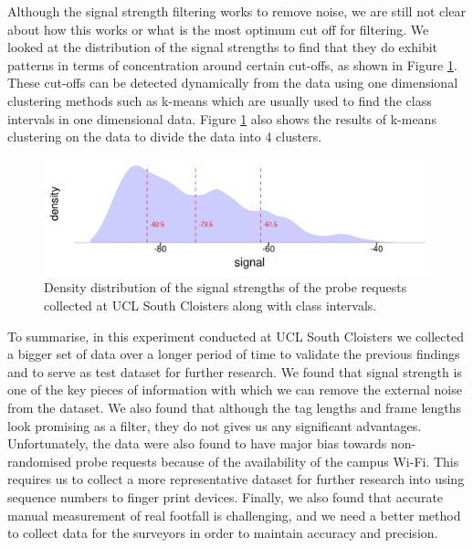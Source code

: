 Although the signal strength filtering works to remove noise, we are still not clear about how this works or what is the most optimum cut off for filtering.
We looked at the distribution of the signal strengths to find that they do exhibit patterns in terms of concentration around certain cut-offs, as shown in Figure \ref{figure:collection:ucl:signal}.
These cut-offs can be detected dynamically from the data using one dimensional clustering methods such as k-means which are usually used to find the class intervals in one dimensional data.
Figure \ref{figure:collection:ucl:signal} also shows the results of k-means clustering on the data to divide the data into 4 clusters.

\begin{figure}
\includegraphics[trim={5 5 5 5},clip]{images/ucl-signal-dist.png}
  \caption{Density distribution of the signal strengths of the probe requests collected at UCL South Cloisters along with class intervals.}
  \label{figure:collection:ucl:signal}
\end{figure}

To summarise, in this experiment conducted at UCL South Cloisters we collected a bigger set of data over a longer period of time to validate the previous findings and to serve as test dataset for further research.
We found that signal strength is one of the key pieces of information with which we can remove the external noise from the dataset.
We also found that although the tag lengths and frame lengths look promising as a filter, they do not gives us any significant advantages. 
Unfortunately, the data were also found to have major bias towards non-randomised probe requests because of the availability of the campus Wi-Fi.
This requires us to collect a more representative dataset for further research into using sequence numbers to finger print devices.
Finally, we also found that accurate manual measurement of real footfall is challenging, and we need a better method to collect data for the surveyors in order to maintain accuracy and precision.

